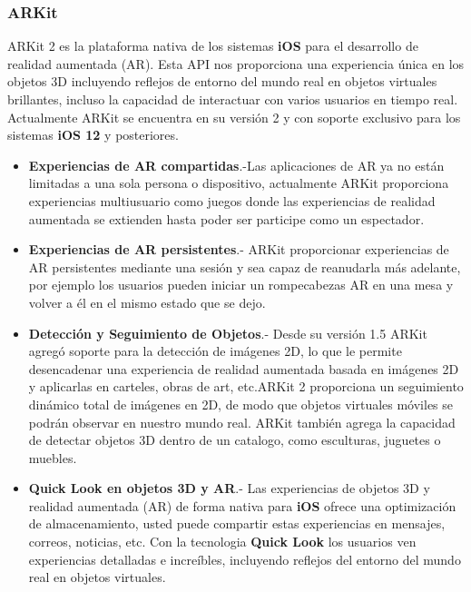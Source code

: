 \subsubsection{ARKit} ARKit 2 es la plataforma nativa de los sistemas \textbf{iOS} para el desarrollo de realidad aumentada (AR). Esta API nos proporciona una experiencia única en los objetos 3D incluyendo reflejos de entorno del mundo real en objetos virtuales brillantes, incluso la capacidad de interactuar con varios usuarios en tiempo real. Actualmente ARKit se encuentra en su versión 2 y con soporte exclusivo para los sistemas \textbf{iOS 12} y posteriores.\cite{B20}
\begin{itemize}
	\item \textbf{Experiencias de AR compartidas}.-Las aplicaciones de AR ya no están limitadas a una sola persona o dispositivo, actualmente ARKit proporciona experiencias multiusuario como juegos donde las experiencias de realidad aumentada se extienden hasta poder ser participe como un espectador.
	\item \textbf{Experiencias de AR persistentes}.-
	ARKit proporcionar experiencias de AR persistentes  mediante una sesión  y sea capaz de reanudarla más adelante, por ejemplo los usuarios pueden iniciar un rompecabezas AR en una mesa y volver a él en el mismo estado que se dejo.

	\item \textbf{Detección y Seguimiento de Objetos}.- Desde su versión 1.5  ARKit agregó soporte para la detección de imágenes 2D, lo que le permite desencadenar una experiencia de realidad aumentada basada en imágenes 2D y aplicarlas en  carteles, obras de art, etc.ARKit 2 proporciona un seguimiento dinámico total de imágenes en 2D, de modo que objetos virtuales móviles se podrán observar en nuestro mundo real. ARKit también agrega la capacidad de detectar objetos 3D dentro de un catalogo, como esculturas, juguetes o muebles.
	\item \textbf{Quick Look en objetos 3D y AR}.- Las experiencias de objetos 3D y realidad aumentada (AR) de forma nativa para \textbf{iOS} ofrece una optimización de almacenamiento, usted puede compartir estas experiencias en mensajes, correos, noticias, etc. Con la tecnologia \textbf{Quick Look} los usuarios ven experiencias detalladas e increíbles, incluyendo reflejos del entorno del mundo real en objetos virtuales.
\end{itemize}
